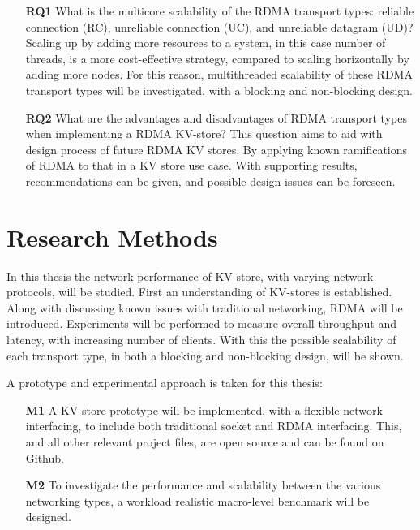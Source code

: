 \begin{itemize}
    \item[\textbf{RQ1}] What is the multicore scalability of the RDMA transport types: reliable connection (RC), unreliable connection (UC), and unreliable datagram (UD)?
    Scaling up by adding more resources to a system, in this case number of threads, is a more cost-effective strategy, compared to scaling horizontally by adding more nodes.
    For this reason, multithreaded scalability of these RDMA transport types will be investigated, with a blocking and non-blocking design.
    \item[\textbf{RQ2}] What are the advantages and disadvantages of RDMA transport types when implementing a RDMA KV-store?
    This question aims to aid with design process of future RDMA KV stores.
    By applying known ramifications of RDMA to that in a KV store use case.
    With supporting results, recommendations can be given, and possible design issues can be foreseen.
\end{itemize}

\section{Research Methods}
In this thesis the network performance of KV store, with varying network protocols, will be studied.
First an understanding of KV-stores is established.
Along with discussing known issues with traditional networking, RDMA will be introduced.
Experiments will be performed to measure overall throughput and latency, with increasing number of clients.
With this the possible scalability of each transport type, in both a blocking and non-blocking design, will be shown.

A prototype\cite{iosup2019atlarge,hamming1998art,peffers2007design} and experimental\cite{jain1990art,heiser2010,ousterhout2018always} approach is taken for this thesis:
\begin{itemize}
    \item[\textbf{M1}] A KV-store prototype will be implemented, with a flexible network interfacing, to include both traditional socket and RDMA interfacing.
    This, and all other relevant project files, are open source and can be found on Github\cite{github}.
    \item[\textbf{M2}] To investigate the performance and scalability between the various networking types, a workload realistic\cite{atikoglu2012workload} macro-level benchmark will be designed.
\end{itemize}

